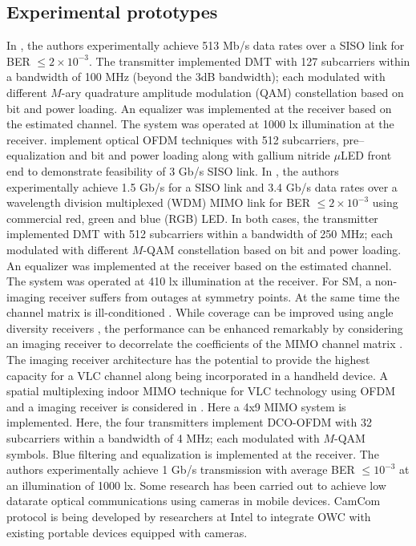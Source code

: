 \subsection{Experimental prototypes}
\label{relatedExperiments}
In \cite{vuc10a}, the authors experimentally achieve 513 Mb/s data rates over a SISO link for BER $\leq 2\times10^{-3}$. The transmitter implemented DMT with 127 subcarriers within a bandwidth of 100 MHz (beyond the 3dB bandwidth); each modulated with different $M$-ary quadrature amplitude modulation (QAM) constellation based on bit and power loading. An equalizer was implemented at the receiver based on the estimated channel. The system was operated at 1000 lx illumination at the receiver. \cite{tso14a} implement optical OFDM techniques with 512 subcarriers, pre--equalization and bit and power loading along with gallium nitride $\mu$LED front end to demonstrate feasibility of 3 Gb/s SISO link. In \cite{cos12a}, the authors experimentally achieve 1.5 Gb/s for a SISO link and 3.4 Gb/s data rates over a wavelength division multiplexed (WDM) MIMO link for BER $\leq 2\times 10^{-3}$ using commercial red, green and blue (RGB) LED. In both cases, the transmitter implemented DMT with 512 subcarriers within a bandwidth of 250 MHz; each modulated with different $M$-QAM constellation based on bit and power loading. An equalizer was implemented at the receiver based on the estimated channel. The system was operated at 410 lx illumination at the receiver. For SM, a non-imaging receiver suffers from outages at symmetry points. At the same time the channel matrix is ill-conditioned \cite{zen09a}.  While coverage can be improved using angle diversity receivers \cite{car00a}, the performance can be enhanced remarkably by considering an imaging receiver to decorrelate the coefficients of the MIMO channel matrix \cite{dja00a}. The imaging receiver architecture \cite{kah98a} has the potential to provide the highest capacity for a VLC channel along being incorporated in a handheld device. A spatial multiplexing indoor MIMO technique for VLC technology using OFDM and a imaging receiver is considered in \cite{azh13a}. Here a 4x9 MIMO system is implemented. Here, the four transmitters implement DCO-OFDM with 32 subcarriers within a bandwidth of 4 MHz; each modulated with $M$-QAM symbols. Blue filtering and equalization is implemented at the receiver. The authors experimentally achieve 1 Gb/s transmission with average BER $\leq 10^{-3}$ at an illumination of 1000 lx. Some research has been carried out to achieve low datarate optical communications using cameras in mobile devices. CamCom protocol \cite{rob13a} is being developed by researchers at Intel to integrate OWC with existing portable devices equipped with cameras.

